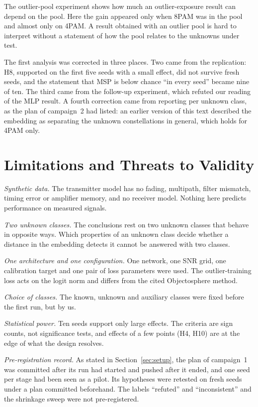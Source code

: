 \documentclass[journal]{IEEEtran}
\begin{document}
The outlier-pool experiment shows how much an outlier-exposure result can
depend on the pool. Here the gain appeared only when 8PAM was in the pool
and almost only on 4PAM. A result obtained with an outlier pool is hard to
interpret without a statement of how the pool relates to the unknowns under
test.

The first analysis was corrected in three places. Two came from the
replication: H8, supported on the first five seeds with a small effect, did
not survive fresh seeds, and the statement that MSP is below chance ``in
every seed'' became nine of ten. The third came from the follow-up
experiment, which refuted our reading of the MLP result. A fourth correction
came from reporting per unknown class, as the plan of campaign~2 had listed:
an earlier version of this text described the embedding as separating the
unknown constellations in general, which holds for 4PAM only.

\section{Limitations and Threats to Validity}
\emph{Synthetic data.} The transmitter model has no fading, multipath,
filter mismatch, timing error or amplifier memory, and no receiver model.
Nothing here predicts performance on measured signals.

\emph{Two unknown classes.} The conclusions rest on two unknown classes that
behave in opposite ways. Which properties of an unknown class decide whether
a distance in the embedding detects it cannot be answered with two classes.

\emph{One architecture and one configuration.} One network, one SNR grid,
one calibration target and one pair of loss parameters were used. The
outlier-training loss acts on the logit norm and differs from the cited
Objectosphere method.

\emph{Choice of classes.} The known, unknown and auxiliary classes were fixed
before the first run, but by us.

\emph{Statistical power.} Ten seeds support only large effects. The criteria
are sign counts, not significance tests, and effects of a few points (H4,
H10) are at the edge of what the design resolves.

\emph{Pre-registration record.} As stated in Section~\ref{sec:setup}, the
plan of campaign~1 was committed after its run had started and pushed after
it ended, and one seed per stage had been seen as a pilot. Its hypotheses
were retested on fresh seeds under a plan committed beforehand. The labels
``refuted'' and ``inconsistent'' and the shrinkage sweep were not
pre-registered.
\end{document}
